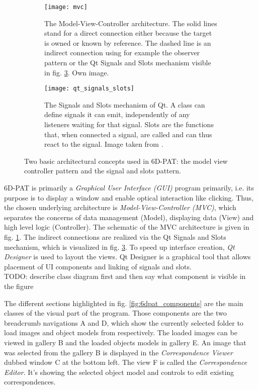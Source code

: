 \begin{figure}[!tbp]
	\centering
	\begin{subfigure}[t]{0.47\textwidth}
		\centering
    	\texttt{[image: mvc]}
    	\caption{The Model-View-Controller architecture. The solid lines stand for a direct connection either because the target is owned or known by reference. The dashed line is an indirect connection using for example the observer pattern or the Qt Signals and Slots mechanism visible in fig. \ref{fig:qt_signals_slots}. Own image.}
    	\label{fig:mvc}
	\end{subfigure}
	\hfill
	\begin{subfigure}[t]{0.47\textwidth}
	\centering
    	\texttt{[image: qt\_signals\_slots]}
    	\caption{The Signals and Slots mechanism of Qt. A class can define signals it can emit, independently of any listeners waiting for that signal. Slots are the functions that, when connected a signal, are called and can thus react to the signal. Image taken from \cite{qt_signals_and_slots}.}
    	\label{fig:qt_signals_slots}
	\end{subfigure}
	\caption{Two basic architectural concepts used in 6D-PAT: the model view controller pattern and the signal and slots pattern.}
\end{figure} 

6D-PAT is primarily a \textit{Graphical User Interface (GUI)} program primarily, i.e. its purpose is to display a window and enable optical interaction like clicking. Thus, the chosen underlying architecture is \textit{Model-View-Controller (MVC)}, which separates the concerns of data management (Model), displaying data (View) and high level logic (Controller). The schematic of the MVC architecture is given in fig. \ref{fig:mvc}. The indirect connections are realized via the Qt Signals and Slots mechanism, which is visualized in fig. \ref{fig:qt_signals_slots}. To speed up interface creation, \textit{Qt Designer} is used to layout the views. Qt Designer is a graphical tool that allows placement of UI components and linking of signals and slots. \\

TODO: describe class diagram first and then say what component is visible in the figure

The different sections highlighted in fig. \ref{fig:6dpat_components} are the main classes of the visual part of the program. Those components are the two breadcrumb navigations A and D, which show the currently selected folder to load images and object models from respectively. The loaded images can be viewed in gallery B and the loaded objects models in gallery E. An image that was selected from the gallery B is displayed in the \textit{Correspondence Viewer} dubbed window C at the bottom left. The view F is called the \textit{Correspondence Editor}. It's showing the selected object model and controls to edit existing correspondences. \\

